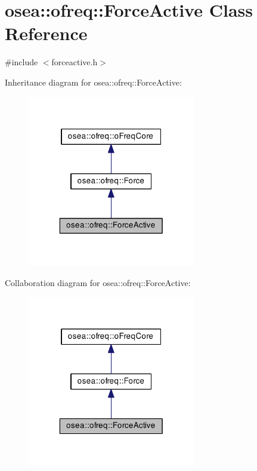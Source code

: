 \hypertarget{classosea_1_1ofreq_1_1_force_active}{\section{osea\-:\-:ofreq\-:\-:Force\-Active Class Reference}
\label{classosea_1_1ofreq_1_1_force_active}
}


{\ttfamily \#include $<$forceactive.\-h$>$}



Inheritance diagram for osea\-:\-:ofreq\-:\-:Force\-Active\-:
\nopagebreak
\begin{figure}[H]
\begin{center}
\leavevmode
\includegraphics[width=208pt]{classosea_1_1ofreq_1_1_force_active__inherit__graph}
\end{center}
\end{figure}


Collaboration diagram for osea\-:\-:ofreq\-:\-:Force\-Active\-:
\nopagebreak
\begin{figure}[H]
\begin{center}
\leavevmode
\includegraphics[width=208pt]{classosea_1_1ofreq_1_1_force_active__coll__graph}
\end{center}
\end{figure}
